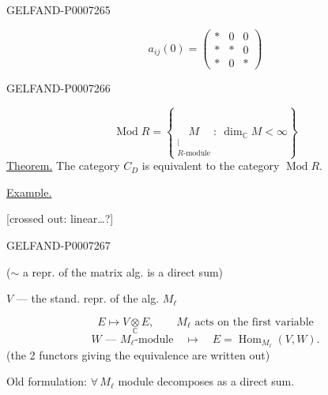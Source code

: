 \begin{GelfandAdjacentEvidence}{GELFAND-P000726}{5}


\[
a_{ij}(0)=\begin{pmatrix}\ast&0&0\\\ast&\ast&0\\\ast&0&\ast\end{pmatrix}
\]
\end{GelfandAdjacentEvidence}
\begin{GelfandAdjacentEvidence}{GELFAND-P000726}{6}


\[
\operatorname{Mod} R=
\left\{\underset{\substack{|\\R\text{-module}}}{M}:\ \dim_{\mathbb C}M<\infty\right\}
\]
\underline{Theorem.} The category \(C_D\) is equivalent to the category \(\operatorname{Mod} R\).

\underline{Example.}

 [crossed out: linear\ldots?] 
\end{GelfandAdjacentEvidence}
\begin{GelfandAdjacentEvidence}{GELFAND-P000726}{7}


(\(\sim\) a repr. of the matrix alg. is a direct sum)

\(V\) --- the stand. repr. of the alg. \(M_\ell\)
\end{GelfandAdjacentEvidence}

\[
E\longmapsto V\underset{\mathbb C}{\otimes}E,\qquad
M_\ell\text{ acts on the first variable}
\]
\[
W\text{ --- }M_\ell\text{-module}\quad\longmapsto\quad
E=\operatorname{Hom}_{M_\ell}(V,W).
\]
(the 2 functors giving the equivalence are written out)

Old formulation: \(\forall\, M_\ell\) module decomposes as a direct sum.


